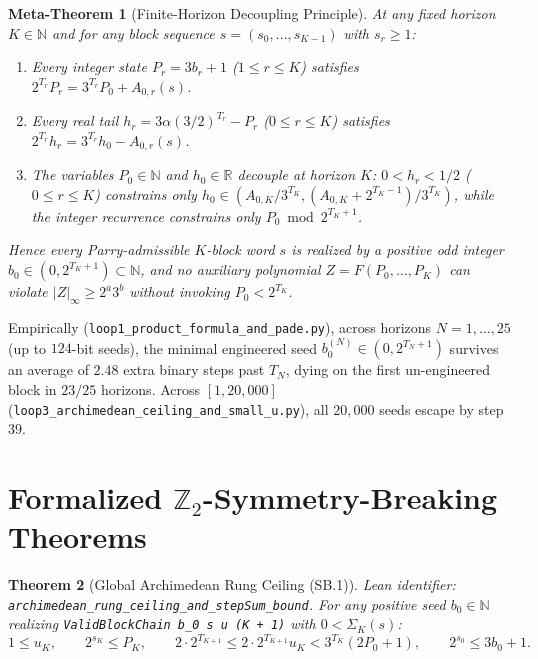\documentclass[11pt]{article}
\newtheorem{theorem}{Theorem}[section]
\newtheorem{metatheorem}[theorem]{Meta-Theorem}
\begin{document}
\begin{metatheorem}[Finite-Horizon Decoupling Principle]\label{thm:meta-decoupling}
At any fixed horizon $K \in \mathbb{N}$ and for any block sequence $s = (s_0, \dots, s_{K-1})$ with $s_r \ge 1$:
\begin{enumerate}
  \item Every integer state $P_r = 3 b_r + 1$ ($1 \le r \le K$) satisfies $2^{T_r} P_r = 3^{T_r} P_0 + A_{0,r}(s)$.
  \item Every real tail $h_r = 3 \alpha (3/2)^{T_r} - P_r$ ($0 \le r \le K$) satisfies $2^{T_r} h_r = 3^{T_r} h_0 - A_{0,r}(s)$.
  \item The variables $P_0 \in \mathbb{N}$ and $h_0 \in \mathbb{R}$ decouple at horizon $K$: $0 < h_r < 1/2$ ($0 \le r \le K$) constrains only $h_0 \in (A_{0,K}/3^{T_K}, (A_{0,K}+2^{T_K-1})/3^{T_K})$, while the integer recurrence constrains only $P_0 \bmod 2^{T_K+1}$.
\end{enumerate}
Hence every Parry-admissible $K$-block word $s$ is realized by a positive odd integer $b_0 \in (0, 2^{T_K+1}) \subset \mathbb{N}$, and no auxiliary polynomial $Z = F(P_0, \dots, P_K)$ can violate $|Z|_\infty \ge 2^a 3^b$ without invoking $P_0 < 2^{T_K}$.
\end{metatheorem}

Empirically (\nolinkurl{loop1_product_formula_and_pade.py}), across horizons $N = 1, \dots, 25$ (up to $124$-bit seeds), the minimal engineered seed $b_0^{(N)} \in (0, 2^{T_N+1})$ survives an average of $2.48$ extra binary steps past $T_N$, dying on the first un-engineered block in $23/25$ horizons. Across $[1, 20{,}000]$ (\nolinkurl{loop3_archimedean_ceiling_and_small_u.py}), all $20{,}000$ seeds escape by step $39$.

\section{Formalized $\mathbb{Z}_2$-Symmetry-Breaking Theorems}

\begin{theorem}[Global Archimedean Rung Ceiling (SB.1)]
\emph{Lean identifier:} \nolinkurl{archimedean_rung_ceiling_and_stepSum_bound}.
For any positive seed $b_0 \in \mathbb{N}$ realizing \texttt{ValidBlockChain b\_0 s u (K + 1)} with $0 < \Sigma_K(s)$:
\[
  1 \le u_K,\qquad 2^{s_K} \le P_K,\qquad 2 \cdot 2^{T_{K+1}} \le 2 \cdot 2^{T_{K+1}} u_K < 3^{T_K}(2 P_0 + 1),\qquad 2^{s_0} \le 3 b_0 + 1.
\]
\end{theorem}
\end{document}
